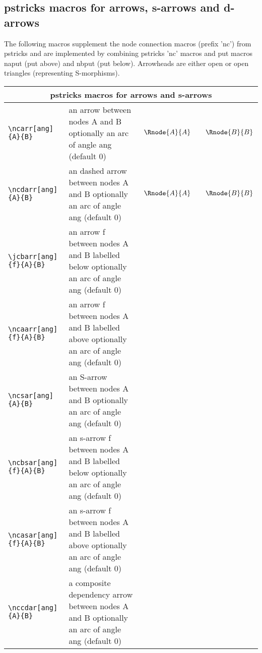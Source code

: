 \documentclass[10pt,a4paper]{article}
\begin{document}
\subsection {pstricks macros for arrows, s-arrows and d-arrows}
The following macros supplement the node connection macros (prefix 'nc') from pstricks and are implemented by combining pstricks 'nc' macros and put macros naput (put above) and nbput (put below). Arrowheads are either open or open triangles (representing S-morphisms). \\
		\begin{tabular}{|l |  p{5cm} | c |}
		\hline
		\multicolumn{3}{|c|}{pstricks macros for arrows and s-arrows} \\
		   \hline	   
		   \verb!\ncarr[ang]{A}{B}! &  an arrow between nodes A and B optionally an arc of angle ang (default 0)
			& $$\Rnode{A}{A} \hspace{0.75cm} \Rnode{B}{B}$$ \ncarr{A}{B}
			\\
		   \hline	   
		   \verb!\ncdarr[ang]{A}{B}! &  an dashed arrow between nodes A and B optionally an arc of angle ang (default 0)
			& $$\Rnode{A}{A} \hspace{0.75cm} \Rnode{B}{B}$$ \ncdarr{A}{B}
			\\
		   \hline
		 	 \verb!\jcbarr[ang]{f}{A}{B}! & an arrow f between nodes A and B labelled below optionally an arc of angle ang (default 0)
			&
			\\
		 	 \hline
		 	 \verb!\ncaarr[ang]{f}{A}{B}! & an arrow f between nodes A and B labelled above optionally an arc of angle ang (default 0)
			&
			\\
			\hline	   
		   \verb!\ncsar[ang]{A}{B}! &  an S-arrow between nodes A and B optionally an arc of angle ang (default 0)
			&
			\raisebox{-0.6cm}{$
\begin{array} {c}
\Rnode{A}{A} \\ [0.6cm]
\Rnode{B}{B}
\end{array}$\ncsar{A}{B}} \\
		 	 \hline			
		 	 \verb!\ncbsar[ang]{f}{A}{B}! & an s-arrow f between nodes A and B labelled below optionally an arc of angle ang (default 0)
			&
			\\
		 	 \hline
		 	 \verb!\ncasar[ang]{f}{A}{B}! & an s-arrow f between nodes A and B labelled above optionally an arc of angle ang (default 0)
			&
			\\
						\hline	   
		   \verb!\nccdar[ang]{A}{B}! &  a composite dependency arrow between nodes A and B optionally an arc of angle ang (default 0)

\end{tabular}
\end{document}
